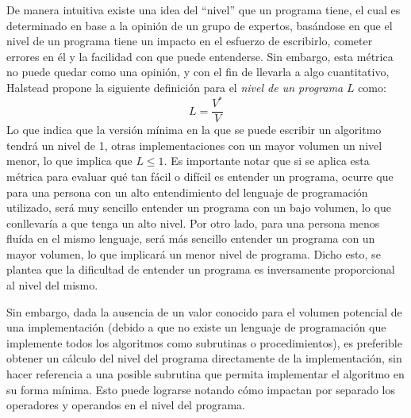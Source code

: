 \documentclass[letterpaper,12pt]{article}
\begin{document}
De manera intuitiva existe una idea del ``nivel'' que un programa tiene, el cual es determinado en base a la opinión de un grupo de expertos, basándose en que el nivel de un programa tiene un impacto en el esfuerzo de escribirlo, cometer errores en él y la facilidad con que puede entenderse. Sin embargo, esta métrica no puede quedar como una opinión, y con el fin de llevarla a algo cuantitativo, Halstead propone la siguiente definición para el \textit{nivel de un programa} $L$ como:
\begin{equation}
  \label{eqn:programLevel}
  L = \frac{V^{*}}{V}
\end{equation}
Lo que indica que la versión mínima en la que se puede escribir un algoritmo tendrá un nivel de 1, otras implementaciones con un mayor volumen un nivel menor, lo que implica que $L \leq 1$. Es importante notar que si se aplica esta métrica para evaluar qué tan fácil o difícil es entender un programa, ocurre que para una persona con un alto entendimiento del lenguaje de programación utilizado, será muy sencillo entender un programa con un bajo volumen, lo que conllevaría a que tenga un alto nivel. Por otro lado, para una persona menos fluída en el mismo lenguaje, será más sencillo entender un programa con un mayor volumen, lo que implicará un menor nivel de programa. Dicho esto, se plantea que la dificultad de entender un programa es inversamente proporcional al nivel del mismo.

Sin embargo, dada la ausencia de un valor conocido para el volumen potencial de una implementación (debido a que no existe un lenguaje de programación que implemente todos los algoritmos como subrutinas o procedimientos), es preferible obtener un cálculo del nivel del programa directamente de la implementación, sin hacer referencia a una posible subrutina que permita implementar el algoritmo en su forma mínima. Esto puede lograrse notando cómo impactan por separado los operadores y operandos en el nivel del programa.
\end{document}
